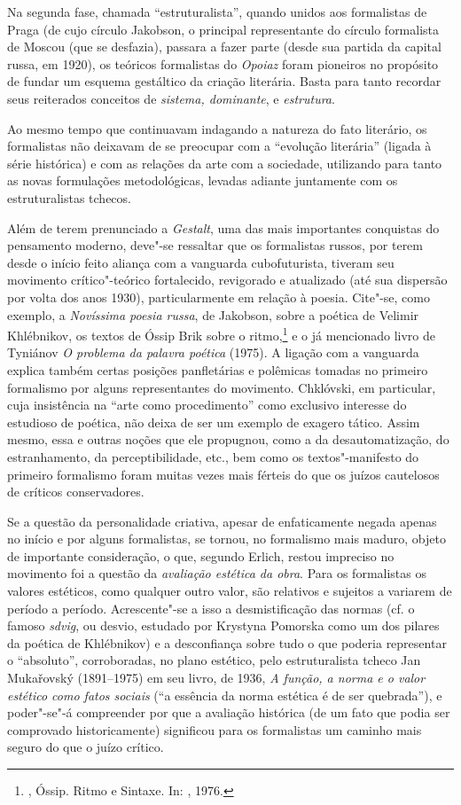 {Na segunda fase, chamada ``estruturalista'', quando unidos aos
formalistas de Praga (de cujo círculo Jakobson, o principal
representante do círculo formalista de Moscou (que se desfazia),
passara a fazer parte (desde sua partida da capital russa, em 1920), os
teóricos formalistas do \emph{Opoiaz} foram pioneiros no propósito de
fundar um esquema gestáltico da criação literária. Basta para tanto
recordar seus reiterados conceitos de \emph{sistema, dominante}, e
\emph{estrutura}.

Ao mesmo tempo que continuavam indagando a natureza do fato literário,
os formalistas não deixavam de se preocupar com a ``evolução literária''
 (ligada à série histórica) e com as relações da arte com a sociedade, utilizando para
tanto as novas formulações metodológicas, levadas
adiante juntamente com os estruturalistas tchecos.

Além de terem prenunciado a \emph{Gestalt}, uma das
mais importantes conquistas do pensamento moderno, deve"-se ressaltar que
os formalistas russos, por terem desde o início feito aliança com a
vanguarda cubofuturista, tiveram seu movimento crítico"-teórico
fortalecido, revigorado e atualizado (até sua dispersão por volta dos
anos 1930), particularmente em relação à poesia. Cite"-se, como exemplo, a
\emph{Novíssima poesia russa}, de Jakobson, sobre a poética de Velimir
Khlébnikov, os textos de Óssip Brik sobre o ritmo,\footnote{, Óssip. Ritmo e Sintaxe. In: 
, 1976.} e o já mencionado
livro de Tyniánov \emph{O problema da palavra poética} (1975). A ligação com a
vanguarda explica também certas posições panfletárias e polêmicas
tomadas no primeiro formalismo por alguns representantes do movimento.
Chklóvski, em particular, cuja insistência na ``arte como
procedimento'' como exclusivo interesse do estudioso de
poética, não deixa de ser um exemplo de exagero tático. Assim mesmo, essa e outras noções que ele propugnou, como a
da desautomatização, do estranhamento, da perceptibilidade, etc., bem
como os textos"-manifesto do primeiro formalismo foram muitas vezes mais
férteis do que os juízos cautelosos de críticos conservadores.

Se a questão da personalidade criativa, apesar de enfaticamente negada apenas no início e por
alguns formalistas, se tornou, no formalismo mais
maduro, objeto de importante consideração, o que, segundo Erlich, restou impreciso no movimento foi a questão da
\emph{avaliação estética da obra}. Para os formalistas os valores
estéticos, como qualquer outro valor, são relativos e sujeitos a
variarem de período a período. Acrescente"-se a isso a desmistificação das
normas (cf. o famoso \emph{sdvig}, ou desvio, estudado por Krystyna
Pomorska como um dos pilares da poética de Khlébnikov) e a desconfiança
sobre tudo o que poderia representar o ``absoluto'', corroboradas,
no plano estético, pelo estruturalista tcheco Jan
Mukařovský (1891--1975) em seu livro, de 1936, \emph{A função, a norma e o valor
estético como fatos sociais} (``a essência da norma estética é de ser
quebrada''), e poder"-se"-á compreender por que a avaliação histórica (de
um fato que podia ser comprovado historicamente) significou para os
formalistas um caminho mais seguro do que o juízo crítico.

}

